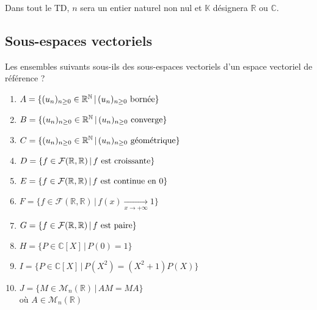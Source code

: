 \documentclass[a4paper,twoside,french,11pt]{VcCours}
\begin{document}

\tableofcontents
\separationTitre
Dans tout le TD, $n$ sera un entier naturel non nul et $\mathbb{K}$ désignera $\mathbb{R}$ ou $\mathbb{C}$.

\medskip

\subsection{Sous-espaces vectoriels}

\begin{Exercice}{} Les ensembles suivants sous-ils des sous-espaces vectoriels d'un espace vectoriel de référence ?

\begin{multicols}{2}
\begin{small}
\begin{enumerate}
\item $A = \lbrace (u_n)_{n \geq 0} \in \mathbb{R}^{\mathbb{N}} \, \vert \, (u_n)_{n \geq 0} \hbox{ bornée} \rbrace $
\item $B = \lbrace (u_n)_{n \geq 0} \in \mathbb{R}^{\mathbb{N}} \, \vert \, (u_n)_{n \geq 0} \hbox{ converge} \rbrace $
\item $C = \lbrace (u_n)_{n \geq 0} \in \mathbb{R}^{\mathbb{N}} \, \vert \, (u_n)_{n \geq 0} \hbox{ géométrique} \rbrace $
\item $D = \lbrace f \in \mathcal{F}(\mathbb{R}, \mathbb{R}) \, \vert \, f \hbox{ est croissante} \rbrace$
\item $E = \lbrace f \in \mathcal{F}(\mathbb{R}, \mathbb{R}) \, \vert \, f \hbox{ est continue en 0} \rbrace$
\columnbreak
\item $F = \lbrace f \in \mathcal{F}(\mathbb{R}, \mathbb{R}) \, \vert \, f(x) \underset{ x \to + \infty}{\longrightarrow} 1 \rbrace$
\item $G= \lbrace f \in \mathcal{F}(\mathbb{R}, \mathbb{R}) \, \vert \, f \hbox{ est paire} \rbrace$
\item $H= \lbrace P \in \mathbb{C}[X] \, \vert \, P(0)=1  \rbrace$
\item $I= \lbrace P \in \mathbb{C}[X] \, \vert \, P(X^2)=(X^2+1)P(X)  \rbrace$
\item $J= \lbrace M \in \mathcal{M}_n(\mathbb{R}) \, \vert \, AM=MA \rbrace$\\ où $A \in \mathcal{M}_n(\mathbb{R})$
\end{enumerate}
\end{small}
\end{multicols}
\vspace{0.01cm}
\end{Exercice}
\end{document}
